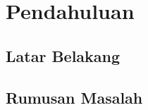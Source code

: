 \documentclass[12pt,oneside]{udthesis}
\makeatletter
\def\maxwidth{ %
  \ifdim\Gin@nat@width>\linewidth
    \linewidth
  \else
    \Gin@nat@width
  \fi
}
\makeatother
\begin{document}









\newcommand{\pieChartFig}
{\begin{figure}[h]
\centering

\texttt{[image: ../figures/stats2-1]} 
\caption{Pie Chart Pekerjaan}
\label{pieChartFig}\end{figure}
}



\newcommand{\tabRegresi}{
\begin{table}[ht]
\centering
\begin{tabular}{lrrrrr}
  \hline
 & Df & Sum Sq & Mean Sq & F value & Pr($>$F) \\ 
  \hline
data2\$total\_fit & 1.000 & 96.998 & 96.998 & 3.679 & 0.065 \\ 
  Residuals & 29.000 & 764.551 & 26.364 &  &  \\ 
   \hline
\end{tabular}
\caption{Regresi Linear} 
\label{tabRegresi}
\end{table}
}



\chapter{Pendahuluan}\label{chap:pendahuluan}

\section{Latar Belakang}
\cite{imansari2015}
\lipsum[2-4]

\section{Rumusan Masalah}
\lipsum[2-4]
\end{document}
